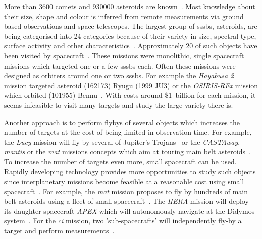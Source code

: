 More than \SI{3600}{} comets and \SI{930000}{} asteroids are known~\cite{nasaSBD_count, mpc2020}. Most knowledge about their size, shape and colour is inferred from remote measurements via ground based observations and space telescopes. The largest group of \glspl{sssb}, asteroids, are being categorised into \SI{24}{} categories because of their variety in size, spectral type, surface activity and other characteristics~\cite{demeo2009extension}. Approximately \SI{20}{} of such objects have been visited by spacecraft~\cite{nasaSBD_missions}. These missions were monolithic, single spacecraft missions which targeted one or a few \glspl{sssb} each. Often these missions were designed as orbiters around one or two \glspl{sssb}. For example the \textit{Hayabusa 2} mission targeted asteroid (162173) Ryugu (1999 JU3) or the \textit{OSIRIS-REx} mission which orbited (101955) Bennu~\cite{Watanabe2017Hayabusa2Overview, lauretta2017osiris}. With costs around \$1~billion for each mission, it seems infeasible to visit many targets and study the large variety there is.

Another approach is to perform flybys of several objects which increases the number of targets at the cost of being limited in observation time. For example, the \textit{Lucy} mission will fly by several of Jupiter's Trojans~\cite{stanbridge2017lucy} or the \textit{CASTAway}, \textit{\gls{mantis}} or the \textit{\gls{mat}} missions concepts which aim at touring main belt asteroids~\cite{bowles2018castaway, rivkin2016mainmantis}. To increase the number of targets even more, small spacecraft can be used. Rapidly developing technology provides more opportunities to study such objects since interplanetary missions become feasible at a reasonable cost using small spacecraft~\cite{Poghosyan2017CubeSatMissions, andrews2019asteroid, snodgrass2019europeanCI}. For example, the \textit{\gls{mat}} mission proposes to fly by hundreds of main belt asteroids using a fleet of small spacecraft~\cite{Slavinskis2018NanospacecraftSails}. The \textit{HERA} mission will deploy its daughter-spacecraft \textit{APEX} which will autonomously navigate at the Didymos system~\cite{Kohout2018FeasibilityStudy}. For the \textit{\gls{ci}} mission, two 'sub-spacecrafts' will independently fly-by a target and perform measurements~\cite{snodgrass2019europeanCI}.

